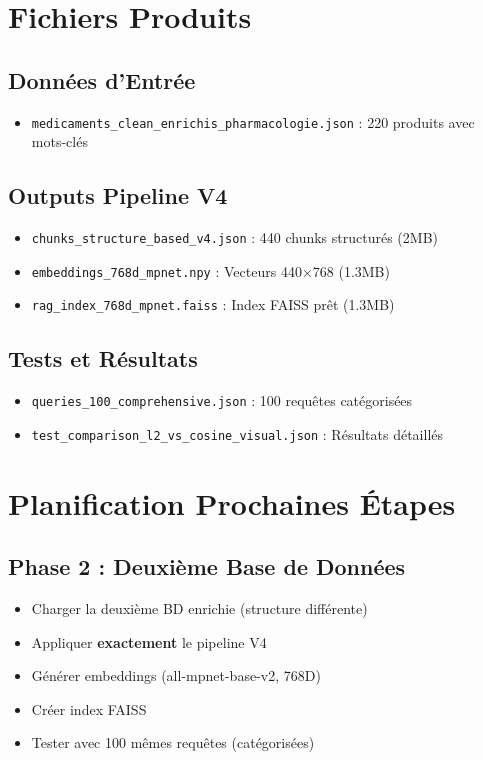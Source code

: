 \documentclass[12pt,a4paper]{article}
\begin{document}
\section{Fichiers Produits}

\subsection{Données d'Entrée}
\begin{itemize}
    \item \texttt{medicaments\_clean\_enrichis\_pharmacologie.json} : 220 produits avec mots-clés
\end{itemize}

\subsection{Outputs Pipeline V4}
\begin{itemize}
    \item \texttt{chunks\_structure\_based\_v4.json} : 440 chunks structurés (2MB)
    \item \texttt{embeddings\_768d\_mpnet.npy} : Vecteurs 440×768 (1.3MB)
    \item \texttt{rag\_index\_768d\_mpnet.faiss} : Index FAISS prêt (1.3MB)
\end{itemize}

\subsection{Tests et Résultats}
\begin{itemize}
    \item \texttt{queries\_100\_comprehensive.json} : 100 requêtes catégorisées
    \item \texttt{test\_comparison\_l2\_vs\_cosine\_visual.json} : Résultats détaillés
\end{itemize}

\section{Planification Prochaines Étapes}

\subsection{Phase 2 : Deuxième Base de Données}
\begin{itemize}
    \item Charger la deuxième BD enrichie (structure différente)
    \item Appliquer \textbf{exactement} le pipeline V4
    \item Générer embeddings (all-mpnet-base-v2, 768D)
    \item Créer index FAISS
    \item Tester avec 100 mêmes requêtes (catégorisées)
\end{itemize}
\end{document}
